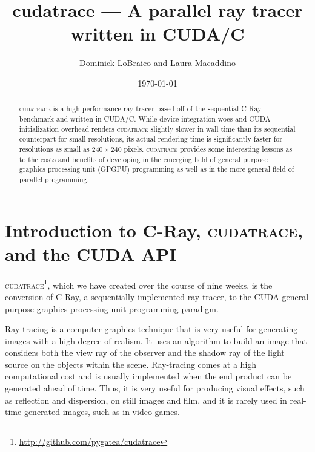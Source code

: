 \documentclass[12pt]{article}
\begin{document}
\lstset{language=C,breaklines=true,frame=single,basicstyle=\footnotesize}

\title{cudatrace --- A parallel ray tracer written in CUDA/C}
\author{Dominick LoBraico and Laura Macaddino}
\date{\today}
\maketitle

\begin{abstract}
    \textsc{cudatrace} is a high performance ray tracer based off of the sequential C-Ray benchmark and written in CUDA/C. While device integration woes and CUDA initialization overhead renders \textsc{cudatrace} slightly slower in wall time than its sequential counterpart for small resolutions, its actual rendering time is significantly faster for resolutions as small as $240 \times 240$ pixels. \textsc{cudatrace} provides some interesting lessons as to the costs and benefits of developing in the emerging field of general purpose graphics processing unit (GPGPU) programming as well as in the more general field of parallel programming.
\end{abstract}

\pagebreak
\tableofcontents
\listoffigures
\listoftables
\pagebreak


\section[Introduction]{Introduction to C-Ray, \textsc{cudatrace}, and the CUDA API}
\textsc{cudatrace}\footnote{\url{http://github.com/pygatea/cudatrace}}, which we have created over the course of nine weeks, is the conversion of C-Ray, a sequentially implemented ray-tracer, to the CUDA general purpose graphics processing unit programming paradigm.

Ray-tracing is a computer graphics technique that is very useful for generating images with a high degree of realism. It uses an algorithm to build an image that considers both the view ray of the observer and the shadow ray of the light source on the objects within the scene. Ray-tracing comes at a high computational cost and is usually implemented when the end product can be generated ahead of time. Thus, it is very useful for producing visual effects, such as reflection and dispersion, on still images and film, and it is rarely used in real-time generated images, such as in video games.
\end{document}
